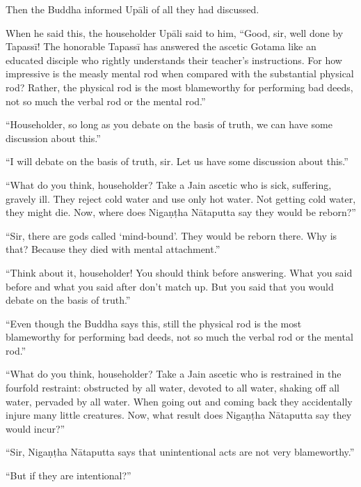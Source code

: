 \documentclass[12pt,openany]{book}%
\begin{document}
Then the Buddha informed \textsanskrit{Upāli} of all they had discussed. 

When he said this, the householder \textsanskrit{Upāli} said to him, “Good, sir, well done by \textsanskrit{Tapassī}! The honorable \textsanskrit{Tapassī} has answered the ascetic Gotama like an educated disciple who rightly understands their teacher’s instructions. For how impressive is the measly mental rod when compared with the substantial physical rod? Rather, the physical rod is the most blameworthy for performing bad deeds, not so much the verbal rod or the mental rod.” 

“Householder, so long as you debate on the basis of truth, we can have some discussion about this.” 

“I will debate on the basis of truth, sir. Let us have some discussion about this.” 

“What do you think, householder? Take a Jain ascetic who is sick, suffering, gravely ill. They reject cold water and use only hot water. Not getting cold water, they might die. Now, where does \textsanskrit{Nigaṇṭha} \textsanskrit{Nātaputta} say they would be reborn?” 

“Sir, there are gods called ‘mind-bound’. They would be reborn there. Why is that? Because they died with mental attachment.” 

“Think about it, householder! You should think before answering. What you said before and what you said after don’t match up. But you said that you would debate on the basis of truth.” 

“Even though the Buddha says this, still the physical rod is the most blameworthy for performing bad deeds, not so much the verbal rod or the mental rod.” 

“What do you think, householder? Take a Jain ascetic who is restrained in the fourfold restraint: obstructed by all water, devoted to all water, shaking off all water, pervaded by all water. When going out and coming back they accidentally injure many little creatures. Now, what result does \textsanskrit{Nigaṇṭha} \textsanskrit{Nātaputta} say they would incur?” 

“Sir, \textsanskrit{Nigaṇṭha} \textsanskrit{Nātaputta} says that unintentional acts are not very blameworthy.” 

“But if they are intentional?” 
\end{document}
